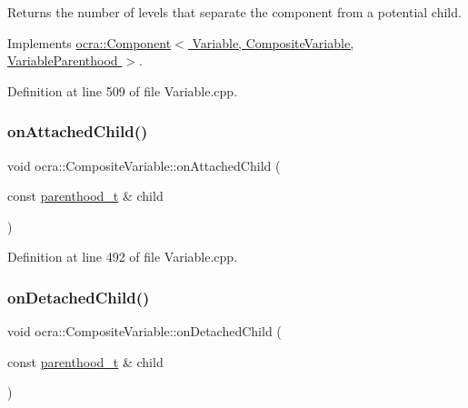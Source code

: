 Returns the number of levels that separate the component from a potential child. 



Implements \hyperlink{classocra_1_1Component_a8a0e052f36c60889562e921751b02a37}{ocra\+::\+Component$<$ Variable, Composite\+Variable, Variable\+Parenthood $>$}.



Definition at line 509 of file Variable.\+cpp.

\hypertarget{classocra_1_1CompositeVariable_a995a870aa6b0a9933ebffd975ce6f6a5}{}\label{classocra_1_1CompositeVariable_a995a870aa6b0a9933ebffd975ce6f6a5} 
\subsubsection{\texorpdfstring{on\+Attached\+Child()}{onAttachedChild()}}
{\footnotesize\ttfamily void ocra\+::\+Composite\+Variable\+::on\+Attached\+Child (\begin{DoxyParamCaption}\item[{const \hyperlink{classocra_1_1Variable_a88444b2124cf5aab069f46734822f31f}{parenthood\+\_\+t} \&}]{child }\end{DoxyParamCaption})\hspace{0.3cm}{\ttfamily [protected]}}



Definition at line 492 of file Variable.\+cpp.

\hypertarget{classocra_1_1CompositeVariable_a76b21bf2425a09aded03b3d7a22c8db8}{}\label{classocra_1_1CompositeVariable_a76b21bf2425a09aded03b3d7a22c8db8} 
\subsubsection{\texorpdfstring{on\+Detached\+Child()}{onDetachedChild()}}
{\footnotesize\ttfamily void ocra\+::\+Composite\+Variable\+::on\+Detached\+Child (\begin{DoxyParamCaption}\item[{const \hyperlink{classocra_1_1Variable_a88444b2124cf5aab069f46734822f31f}{parenthood\+\_\+t} \&}]{child }\end{DoxyParamCaption})\hspace{0.3cm}{\ttfamily [protected]}}



